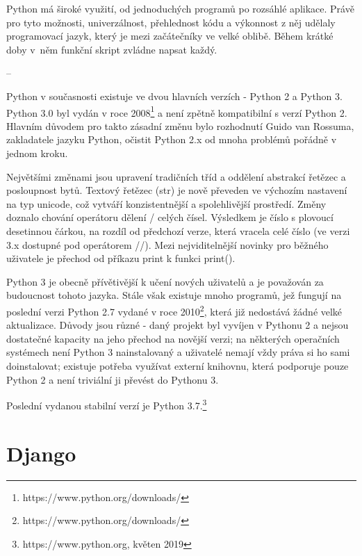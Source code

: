 Python má široké využití, od jednoduchých programů po rozsáhlé
aplikace. Právě pro tyto možnosti, univerzálnost, přehlednost kódu a
výkonnost z něj udělaly programovací jazyk, který je mezi začátečníky ve
velké oblibě. Během krátké doby v~něm funkční skript zvládne napsat
každý.

--


Python v současnosti existuje ve dvou hlavních verzích - Python 2 a
Python 3. Python 3.0 byl vydán v roce
2008\footnote{https://www.python.org/downloads/} a není zpětně
kompatibilní s verzí Python 2. Hlavním důvodem pro takto zásadní změnu
bylo rozhodnutí Guido van Rossuma, zakladatele jazyku Python, očistit
Python 2.x od mnoha problémů pořádně v jednom kroku.

Největšími změnami jsou upravení tradičních tříd a oddělení abstrakcí
\textsf{řetězec} a \textsf{posloupnost bytů}. Textový řetězec
(\textsf{str}) je nově převeden ve výchozím nastavení na typ unicode,
což vytváří konzistentnější a spolehlivější prostředí. Změny doznalo
chování operátoru dělení \textsf{/} celých čísel. Výsledkem je číslo s
plovoucí desetinnou čárkou, na rozdíl od předchozí verze, která
vracela celé číslo (ve verzi 3.x dostupné pod operátorem
\textsf{//}). Mezi nejviditelnější novinky pro běžného uživatele je
přechod od příkazu \textsf{print} k funkci \textsf{print()}.

Python 3 je obecně přívětivější k učení nových uživatelů a je
považován za budoucnost tohoto jazyka. Stále však existuje mnoho
programů, jež fungují na poslední verzi Python 2.7 vydané v roce
2010\footnote{https://www.python.org/downloads/}, která již nedostává
žádné velké aktualizace. Důvody jsou různé - daný projekt byl vyvíjen
v Pythonu 2 a nejsou dostatečné kapacity na jeho přechod na novější
verzi; na některých operačních systémech není Python 3 nainstalovaný a
uživatelé nemají vždy práva si ho sami doinstalovat; existuje potřeba
využívat externí knihovnu, která podporuje pouze Python 2 a není
triviální ji převést do Pythonu 3.

Poslední vydanou stabilní verzí je Python
3.7.\footnote{https://www.python.org, květen 2019}

\section{Django}

